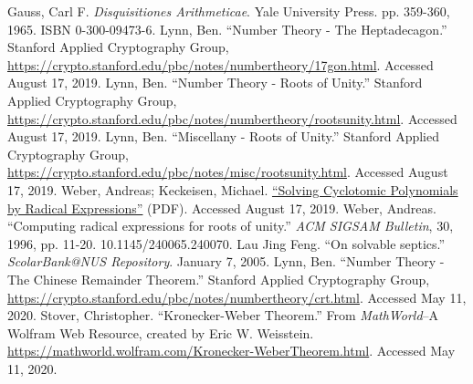 \documentclass{article}
\begin{document}
\begin{thebibliography}{9}
        Gauss, Carl F. \textit{Disquisitiones Arithmeticae}. Yale University Press. pp. 359-360, 1965. ISBN 0-300-09473-6.
        Lynn, Ben. ``Number Theory - The Heptadecagon.'' Stanford Applied Cryptography Group, \url{https://crypto.stanford.edu/pbc/notes/numbertheory/17gon.html}. Accessed August 17, 2019.
        Lynn, Ben. ``Number Theory - Roots of Unity.'' Stanford Applied Cryptography Group, \url{https://crypto.stanford.edu/pbc/notes/numbertheory/rootsunity.html}. Accessed August 17, 2019.
        Lynn, Ben. ``Miscellany - Roots of Unity.'' Stanford Applied Cryptography Group, \url{https://crypto.stanford.edu/pbc/notes/misc/rootsunity.html}. Accessed August 17, 2019.
        Weber, Andreas; Keckeisen, Michael. \href{http://cg.cs.uni-bonn.de/personal-pages/weber/publications/pdf/WeberA/WeberKeckeisen99a.pdf}{``Solving Cyclotomic Polynomials by Radical Expressions''} (PDF). Accessed August 17, 2019.
        Weber, Andreas. ``Computing radical expressions for roots of unity.'' \textit{ACM SIGSAM Bulletin}, 30, 1996, pp. 11-20. 10.1145/240065.240070.
        Lau Jing Feng. ``On solvable septics.'' \textit{ScolarBank@NUS Repository}. January 7, 2005.
        Lynn, Ben. ``Number Theory - The Chinese Remainder Theorem.'' Stanford Applied Cryptography Group, \url{https://crypto.stanford.edu/pbc/notes/numbertheory/crt.html}. Accessed May 11, 2020.
         Stover, Christopher. ``Kronecker-Weber Theorem.'' From \textit{MathWorld}--A Wolfram Web Resource, created by Eric W. Weisstein. \url{https://mathworld.wolfram.com/Kronecker-WeberTheorem.html}. Accessed May 11, 2020.
\end{thebibliography}
\end{document}
